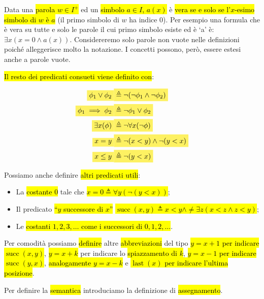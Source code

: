 \documentclass[a4paper,11pt,twoside]{article}
\theoremstyle{plain}
\theoremstyle{definition}
\theoremstyle{remark}
\newcommand{\mhl}[1]{\colorbox{hlcolor}{$\displaystyle #1$}}
\DeclareMathOperator{\succc}{succ}
\DeclareMathOperator{\last}{last}
\begin{document}
Data una \hl{parola $w \in I^+$} ed un \hl{simbolo $a\in I$, $a(x)$} è \hl{vera
se e solo se l'$x$-esimo simbolo di $w$ è $a$} (il primo simbolo di $w$ ha
indice 0). Per esempio una formula che è vera su tutte e solo le parole il cui
primo simbolo esiste ed è `a' è: $\exists x(x = 0 \land a(x))$. Considereremo
solo parole non vuote nelle definizioni poiché alleggerisce molto la notazione.
I concetti possono, però, essere estesi anche a parole vuote.

\hl{Il resto dei predicati consueti viene definito con}:

\begin{align}
  \mhl{\phi_1 \lor \phi_2}     & \mhl{\triangleq \neg(\neg\phi_1\land\neg\phi_2)} \\
  \mhl{\phi_1 \implies \phi_2} & \mhl{\triangleq \neg\phi_1\lor\phi_2} \\
  \mhl{\exists x(\phi)}        & \mhl{\triangleq \neg \forall x(\neg\phi)} \\
  \mhl{x = y}                  & \mhl{\triangleq \neg(x<y) \land \neg(y<x)} \\
  \mhl{x \leq y}               & \mhl{\triangleq \neg(y<x)}
\end{align}

Possiamo anche definire \hl{altri predicati utili}:

\begin{itemize}
  \item La \hl{costante $0$} tale che \hl{$x = 0 \triangleq \forall
    y(\neg(y<x))$};
  \item Il predicato \hl{``$y$ successore di  $x$''}
    \hl{$\succc(x,y) \triangleq x<y \land \neq\exists z(x<z \land z<y)$};
  \item Le \hl{costanti $1,2,3,\ldots$ come i successori di $0,1,2,\ldots$}.
\end{itemize}

Per comodità possiamo \hl{definire} altre \hl{abbreviazioni} del tipo
\hl{$y=x+1$ per indicare $\succc(x,y)$}, \hl{$y=x+k$} per indicare lo
\hl{spiazzamento di $k$}, \hl{$y=x-1$ per indicare $\succc(y,x)$},
\hl{analogamente $y=x-k$} e \hl{$\last(x)$ per indicare l'ultima posizione}.

Per definire la \hl{semantica} introduciamo la definizione di \hl{assegnamento}.
\end{document}
